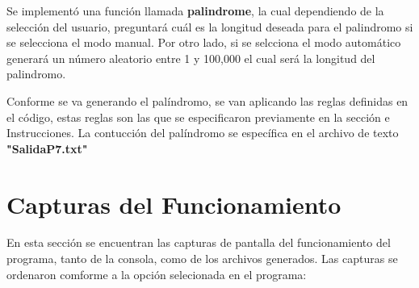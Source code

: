 \documentclass{article}
\begin{document}
	Se implementó una función llamada \textbf{palindrome}, la cual dependiendo de la selección del usuario, preguntará cuál es la longitud deseada para el palindromo si se selecciona el modo manual. Por otro lado, si se selcciona el modo automático generará un número aleatorio entre 1 y 100,000 el cual será la longitud del palindromo.
	
	Conforme se va generando el palíndromo, se van aplicando las reglas definidas en el código, estas reglas son las que se especificaron previamente en la sección e Instrucciones. La contucción del palíndromo se específica en el archivo de texto \textbf{"SalidaP7.txt"}
	
	\section*{Capturas del Funcionamiento}
	En esta sección se encuentran las capturas de pantalla del funcionamiento del programa, tanto de la consola, como de los archivos generados.
	Las capturas se ordenaron comforme a la opción selecionada en el programa: 
\end{document}
